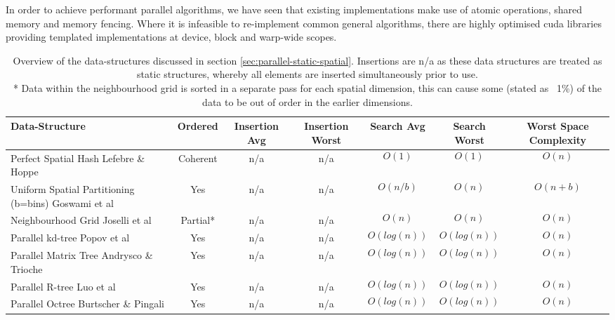      In order to achieve performant parallel algorithms, we have seen that existing implementations make use of \gls{atomic} operations, shared memory and memory fencing. Where it is infeasible to re-implement common general algorithms, there are highly optimised \gls{cuda} libraries providing templated implementations at device, block and warp-wide scopes.
     
\tabulinesep=1.2mm
\begin{landscape}
\newpage
\begin{table}
\begin{tabu}{|X[m,c]|c|c|c|c|c|c|}
\hline 
Data-Structure & Ordered & Insertion Avg & Insertion Worst & Search Avg & Search Worst & Worst Space Complexity\\
\hline 
Perfect Spatial Hash \linebreak Lefebre \& Hoppe \cite{LH06} & Coherent & n/a & n/a & $$O(1)$$ & $$O(1)$$ & $$O(n)$$\\
\hline
Uniform Spatial Partitioning (b=bins) \linebreak Goswami et al \cite{GS*10} & Yes & n/a & n/a & $$O(n/b)$$ & $$O(n)$$ & $$O(n+b)$$\\
\hline 
Neighbourhood Grid \linebreak Joselli et al \cite{JR*15} & Partial* & n/a & n/a & $$O(n)$$ & $$O(n)$$ & $$O(n)$$\\
\hline 
Parallel kd-tree \linebreak Popov et al \cite{PG*07} & Yes & n/a & n/a & $$O(log(n))$$ & $$O(log(n))$$ & $$O(n)$$\\
\hline 
Parallel Matrix Tree \linebreak Andrysco \& Trioche \cite{AT10} & Yes & n/a & n/a & $$O(log(n))$$ & $$O(log(n))$$ & $$O(n)$$\\
\hline 
Parallel R-tree \linebreak Luo et al \cite{LWL12} & Yes & n/a & n/a & $$O(log(n))$$ & $$O(log(n))$$ & $$O(n)$$\\
\hline 
Parallel Octree \linebreak Burtscher \& Pingali \cite{BP11} & Yes & n/a & n/a & $$O(log(n))$$ & $$O(log(n))$$ & $$O(n)$$\\
\hline 
\end{tabu}

\protect\caption[Overview of the static spatial data-structures discussed in section \ref{sec:parallel-static-spatial}.]{Overview of the data-structures discussed in section \ref{sec:parallel-static-spatial}. Insertions are n/a as these data structures are treated as static structures, whereby all elements are inserted simultaneously prior to use. \\ * Data within the neighbourhood grid is sorted in a separate pass for each spatial dimension, this can cause some (stated as ~1\%) of the data to be out of order in the earlier dimensions.\label{tab:parallel-structures}}


\end{table}
\end{landscape}